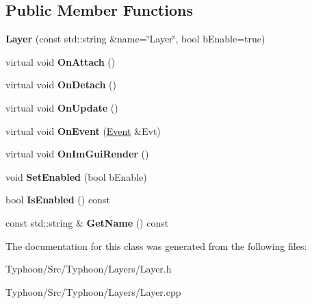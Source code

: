 \subsection*{Public Member Functions}
\begin{DoxyCompactItemize}
\item 
\mbox{\label{class_typhoon_engine_1_1_layer_a4c6f96479674829119d4a711c4b074b4}} 
{\bfseries Layer} (const std\+::string \&name=\char`\"{}Layer\char`\"{}, bool b\+Enable=true)
\item 
\mbox{\label{class_typhoon_engine_1_1_layer_a0700ecb40265b016c2f5a6b5c80debb7}} 
virtual void {\bfseries On\+Attach} ()
\item 
\mbox{\label{class_typhoon_engine_1_1_layer_a390d4e7e633bdd33f2e9504a4a45dc49}} 
virtual void {\bfseries On\+Detach} ()
\item 
\mbox{\label{class_typhoon_engine_1_1_layer_a2a9399d23e576935cc66f543ac90d967}} 
virtual void {\bfseries On\+Update} ()
\item 
\mbox{\label{class_typhoon_engine_1_1_layer_a44eb6d4e4f1129ed32bf7b7be35d9772}} 
virtual void {\bfseries On\+Event} (\mbox{\hyperlink{class_typhoon_engine_1_1_event}{Event}} \&Evt)
\item 
\mbox{\label{class_typhoon_engine_1_1_layer_ad48121cb13ff85865ea90d98ea3a66f7}} 
virtual void {\bfseries On\+Im\+Gui\+Render} ()
\item 
\mbox{\label{class_typhoon_engine_1_1_layer_a0bfe5de94fa4a1ce9e16c3b448271891}} 
void {\bfseries Set\+Enabled} (bool b\+Enable)
\item 
\mbox{\label{class_typhoon_engine_1_1_layer_ab4669f63fd959d09032cef47915f07e7}} 
bool {\bfseries Is\+Enabled} () const
\item 
\mbox{\label{class_typhoon_engine_1_1_layer_ac89f2468c566b61b455db5754cbe2a45}} 
const std\+::string \& {\bfseries Get\+Name} () const
\end{DoxyCompactItemize}


The documentation for this class was generated from the following files\+:\begin{DoxyCompactItemize}
\item 
Typhoon/\+Src/\+Typhoon/\+Layers/Layer.\+h\item 
Typhoon/\+Src/\+Typhoon/\+Layers/Layer.\+cpp\end{DoxyCompactItemize}
